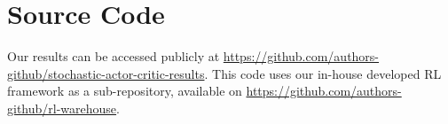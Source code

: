 \documentclass[10pt]{article} %
\begin{document}
\begin{appendices}
\begin{figure}[H]
\begin{minipage}{.5\textwidth}
		
		\label{fig:policy_visual}
	\end{minipage}
\end{figure}
	
	\section{Source Code}
	\label{app:code}
	Our results can be accessed publicly at \url{https://github.com/authors-github/stochastic-actor-critic-results}. This code uses our in-house developed RL framework as a sub-repository, available on \url{https://github.com/authors-github/rl-warehouse}. 
	
\end{appendices}
\end{document}
